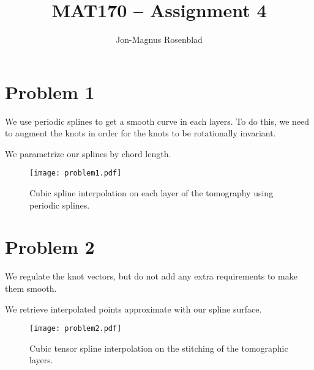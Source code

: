 \documentclass[english]{article}
\title{MAT170 -- Assignment 4}
\author{Jon-Magnus Rosenblad}
\date{}
\begin{document}
\maketitle

\section*{Problem 1}

We use periodic splines to get a smooth curve in each layers.
To do this, we need to augment the knots in order for the knots to be rotationally invariant.




We parametrize our splines by chord length.



\begin{figure}
    \centering
    \texttt{[image: problem1.pdf]}
    \caption{Cubic spline interpolation on each layer of the tomography using periodic splines.}
\end{figure}

\section*{Problem 2}

We regulate the knot vectors, but do not add any extra requirements to make them smooth.



We retrieve interpolated points approximate with our spline surface.



\begin{figure}
    \centering
    \texttt{[image: problem2.pdf]}
    \caption{Cubic tensor spline interpolation on the stitching of the tomographic layers.}
\end{figure}
\end{document}
